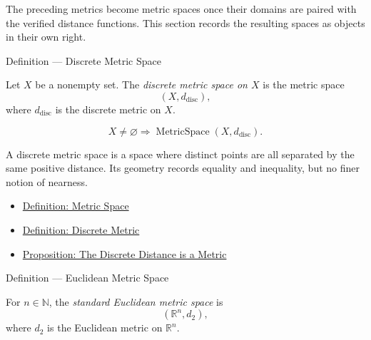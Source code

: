 \begin{remark*}[Exposition]
The preceding metrics become metric spaces once their domains are paired with
the verified distance functions.  This section records the resulting spaces as
objects in their own right.
\end{remark*}

\begin{definitionbox}{Definition --- Discrete Metric Space}
\begin{definition}\label{def:discrete-metric-space}
Let \(X\) be a nonempty set.  The \emph{discrete metric space on \(X\)} is the
metric space
\[
  (X,d_{\mathrm{disc}}),
\]
where \(d_{\mathrm{disc}}\) is the discrete metric on \(X\).
\end{definition}
\end{definitionbox}

\begin{remark*}
\[
X\neq\varnothing
\Longrightarrow
\operatorname{MetricSpace}(X,d_{\mathrm{disc}}).
\]
\end{remark*}

\begin{remark*}[Interpretation]
A discrete metric space is a space where distinct points are all separated by
the same positive distance.  Its geometry records equality and inequality, but
no finer notion of nearness.
\end{remark*}

\begin{dependencies}
\begin{itemize}
  \item \hyperref[def:metric-space]{Definition: Metric Space}
  \item \hyperref[def:discrete-metric]{Definition: Discrete Metric}
  \item \hyperref[prop:discrete-metric-space]{Proposition: The Discrete Distance is a Metric}
\end{itemize}
\end{dependencies}

\begin{definitionbox}{Definition --- Euclidean Metric Space}
\begin{definition}\label{def:euclidean-metric-space}
For \(n\in\mathbb{N}\), the \emph{standard Euclidean metric space} is
\[
  (\mathbb{R}^n,d_2),
\]
where \(d_2\) is the Euclidean metric on \(\mathbb{R}^n\).
\end{definition}
\end{definitionbox}

